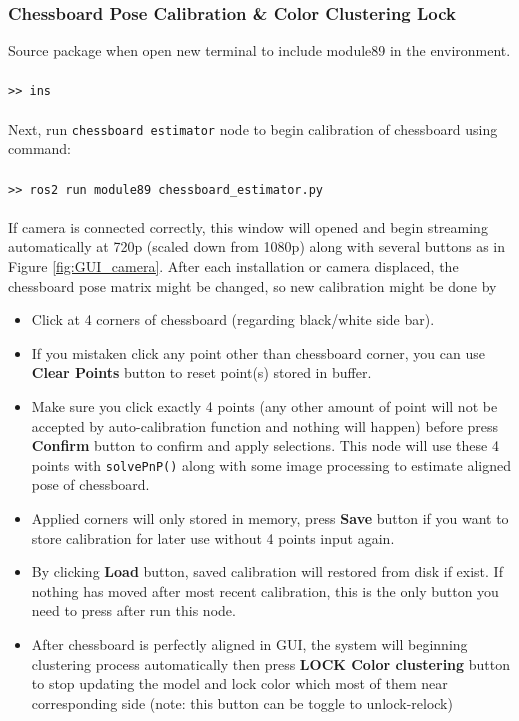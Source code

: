 \documentclass[11pt,fleqn]{book} %
\begin{document}
\subsubsection{Chessboard Pose Calibration \& Color Clustering Lock}
Source package when open new terminal to include module89 in the environment.\\
\\
\texttt{>> ins}\\
\\
Next, run \texttt{chessboard estimator} node to begin calibration of chessboard using command:\\
\\
\texttt{>> ros2 run module89 chessboard\_estimator.py}\\
\\
If camera is connected correctly, this window will opened and begin streaming automatically at 720p (scaled down from 1080p) along with several buttons as in Figure \ref{fig:GUI_camera}. After each installation or camera displaced, the chessboard pose matrix might be changed, so new calibration might be done by\\
\begin{itemize}
    \item Click at 4 corners of chessboard (regarding black/white side bar).
    \item If you mistaken click any point other than chessboard corner, you can use \textbf{Clear Points} button to reset point(s) stored in buffer.
    \item Make sure you click exactly 4 points (any other amount of point will not be accepted by auto-calibration function and nothing will happen) before press \textbf{Confirm} button to confirm and apply selections. This node will use these 4 points with \texttt{solvePnP()} along with some image processing to estimate aligned pose of chessboard.
    \item Applied corners will only stored in memory, press \textbf{Save} button if you want to store calibration for later use without 4 points input again.
    \item By clicking \textbf{Load} button, saved calibration will restored from disk if exist. If nothing has moved after most recent calibration, this is the only button you need to press after run this node.
    \item After chessboard is perfectly aligned in GUI, the system will beginning clustering process automatically then press \textbf{LOCK Color clustering} button to stop updating the model and lock color which most of them near corresponding side (note: this button can be toggle to unlock-relock)
    
\end{itemize}
\end{document}
